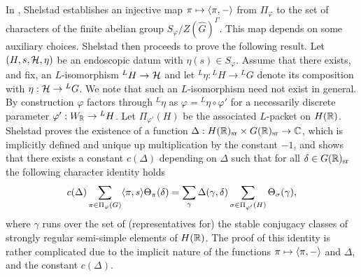 \documentclass{article}
\theoremstyle{definition}
\numberwithin{equation}{section}
\renewcommand{\-}{\hyp{}}
\begin{document}
In \cite{She82}, Shelstad establishes an injective map $\pi \mapsto \langle\pi,-\rangle$ from $\Pi_\varphi$ to the set of characters of the finite abelian group $S_\varphi/Z(\hat G)^\Gamma$. This map depends on some auxiliary choices. Shelstad then proceeds to prove the following result. Let $(H,s,\mathcal{H},\eta)$ be an endoscopic datum with $\eta(s) \in S_\varphi$. Assume that there exists, and fix, an $L$\-isomorphism $^LH \to \mathcal{H}$ and let $^L\eta : {^LH} \to {^LG}$ denote its composition with $\eta : \mathcal{H} \to {^LG}$. We note that such an $L$\-isomorphism need not exist in general. By construction $\varphi$ factors through $^L\eta$ as $\varphi = {^L\eta}\circ\varphi'$ for a necessarily discrete parameter $\varphi' : W_{\mathbb{R}} \to {^LH}$. Let $\Pi_{\varphi'}(H)$ be the associated $L$\-packet on $H(\mathbb{R})$. Shelstad proves the existence of a function $\Delta : H(\mathbb{R})_{\textrm{sr}} \times G(\mathbb{R})_{\textrm{sr}} \to \mathbb{C}$, which is implicitly defined and unique up multiplication by the constant $-1$, and shows that there exists a constant $c(\Delta)$ depending on $\Delta$ such that for all $\delta \in G(\mathbb{R})_{\textrm{sr}}$ the following character identity holds
\begin{equation} \label{eq:s1}
c(\Delta)\sum_{\pi \in \Pi_\varphi(G)}\langle\pi,s\rangle\Theta_\pi(\delta) = \sum_\gamma \Delta(\gamma,\delta)\sum_{\sigma \in \Pi_{\varphi'}(H)} \Theta_{\sigma}(\gamma),
\end{equation}
where $\gamma$ runs over the set of (representatives for) the stable conjugacy classes of strongly regular semi-simple elements of $H(\mathbb{R})$. The proof of this identity is rather complicated due to the implicit nature of the functions $\pi \mapsto \langle\pi,-\rangle$ and $\Delta$, and the constant $c(\Delta)$.
\end{document}
